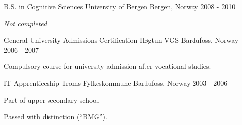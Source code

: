 

\begin{cventries}

  \cventry
    {B.S. in Cognitive Sciences} %
    {University of Bergen} %
    {Bergen, Norway} %
    {2008 - 2010} %
    {
      \begin{cvitems} %
        \item \em {Not completed.}
      \end{cvitems}
    }

  \cventry
    {General University Admissions Certification} %
    {Høgtun VGS} %
    {Bardufoss, Norway} %
    {2006 - 2007} %
    {
      \begin{cvitems} %
        \item {Compulsory course for university admission after vocational studies.}
      \end{cvitems}
    }

  \cventry
    {IT Apprenticeship} %
    {Troms Fylkeskommune} %
    {Bardufoss, Norway} %
    {2003 - 2006} %
    {
      \begin{cvitems} %
        \item {Part of upper secondary school.}
        \item {Passed with distinction (``BMG'').}
      \end{cvitems}
    }
\end{cventries}
